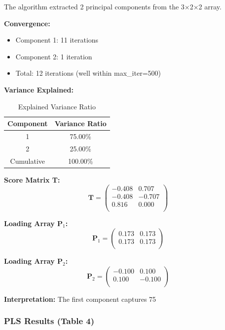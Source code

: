 \documentclass[12pt,a4paper]{article}
\begin{document}
The algorithm extracted 2 principal components from the 3×2×2 array.

\textbf{Convergence:}
\begin{itemize}
    \item Component 1: 11 iterations
    \item Component 2: 1 iteration
    \item Total: 12 iterations (well within max\_iter=500)
\end{itemize}

\textbf{Variance Explained:}
\begin{table}[H]
\centering
\caption{Explained Variance Ratio}
\begin{tabular}{cc}
\toprule
Component & Variance Ratio \\
\midrule
1 & 75.00\% \\
2 & 25.00\% \\
\midrule
Cumulative & 100.00\% \\
\bottomrule
\end{tabular}
\end{table}

\textbf{Score Matrix T:}
$$\mathbf{T} = \begin{pmatrix}
-0.408 & 0.707 \\
-0.408 & -0.707 \\
0.816 & 0.000 \\
\end{pmatrix}$$

\textbf{Loading Array $\mathbf{P}_1$:}
$$\mathbf{P}_1 = \begin{pmatrix}
0.173 & 0.173 \\
0.173 & 0.173 \\
\end{pmatrix}$$

\textbf{Loading Array $\mathbf{P}_2$:}
$$\mathbf{P}_2 = \begin{pmatrix}
-0.100 & 0.100 \\
0.100 & -0.100 \\
\end{pmatrix}$$

\textbf{Interpretation:}
The first component captures 75%

\subsubsection{PLS Results (Table 4)}
\end{document}
